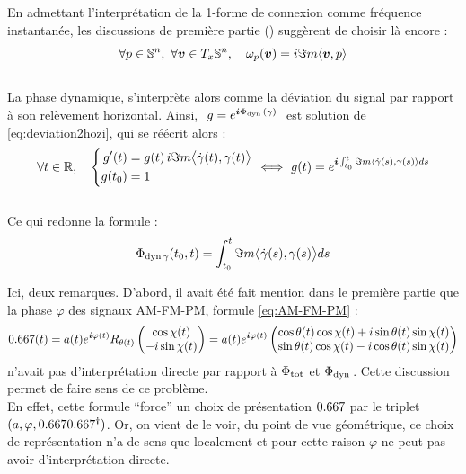 En admettant l'interprétation de la 1-forme de connexion comme fréquence instantanée, les discussions de première partie () suggèrent de choisir là encore :
\begin{equation} \label{eq:conn2SUPC}
	\forall p\in\S{n},\ \forall \bf{v}\in\tg[x]{\S{n}},\quad \conn_p(\bf{v}) = i\Im m \langle \bf{v}, p\rangle
\end{equation}
\\
La phase dynamique, s'interprète alors comme la déviation du signal par rapport à son relèvement horizontal. Ainsi, $\ g = e^{\i \phased(\gamma)}\ $ est solution de \eqref{eq:deviation2hozi}, qui se réécrit alors :
\[\forall t\in\R,\quad \left\{ \begin{aligned}
	g'(t)  &= g(t)\, i\Im m \big\langle \dot{\gamma}(t) , \gamma(t) \big\rangle \\
	g(t_0) &= 1
\end{aligned}\ \right. \Llr\ g(t) = e^{\i  \int_{t_0}^t \Im m\langle \dot{\gamma}(s) , \gamma(s) \rangle ds}\]
\\
Ce qui redonne la formule :
\begin{equation}\label{eq:phased_vgeodiff}
	\phased[\gamma](t_0, t) = \int_{t_0}^t \Im m\big\langle \dot{\gamma}(s) , \gamma(s) \big\rangle ds
\end{equation}
\skipl

Ici, deux remarques. D'abord, il avait été fait mention dans le première partie que la phase $\varphi$ des signaux AM-FM-PM, formule \eqref{eq:AM-FM-PM} :
\[\x(t) = a(t)e^{\i \varphi(t)} R_{\theta(t)} \begin{pmatrix} \cos\chi(t) \\ -i\sin\chi(t) \end{pmatrix} 
= a(t)e^{\i \varphi(t)} \begin{pmatrix} \cos\theta(t) \cos\chi(t) + i\sin\theta(t) \sin\chi(t) \\ \sin\theta(t) \cos\chi(t) - i\cos\theta(t) \sin\chi(t) \end{pmatrix}\]
n'avait pas d'interprétation directe par rapport à $\phaset$ et $\phased$.
Cette discussion permet de faire sens de ce problème.
\\
En effet, cette formule ``force'' un choix de présentation $\x$ par le triplet $(a, \varphi, \x\x^\dagger)$.
Or, on vient de le voir, du point de vue géométrique, ce choix de représentation n'a de sens que localement et pour cette raison $\varphi$ ne peut pas avoir d'interprétation directe.
\\

